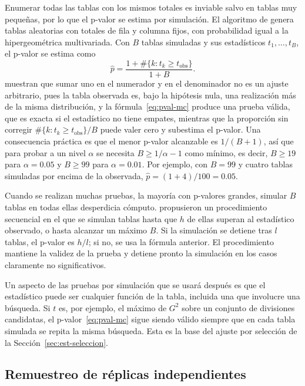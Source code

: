Enumerar todas las tablas con los mismos totales es inviable salvo en tablas muy
pequeñas, por lo que el p-valor se estima por simulación. El algoritmo de
\citet{Patefield1981} genera tablas aleatorias con totales de fila y columna
fijos, con probabilidad igual a la hipergeométrica multivariada. Con $B$ tablas
simuladas y sus estadísticos $t_1, \dots, t_B$, el p-valor se estima como
\begin{equation}\label{eq:pval-mc}
  \hat{p} = \frac{1 + \#\{k : t_k \ge t_{\mathrm{obs}}\}}{1 + B} .
\end{equation}
\citet{Phipson2010} muestran que sumar uno en el numerador y en el denominador no
es un ajuste arbitrario, pues la tabla observada es, bajo la hipótesis nula, una
realización más de la misma distribución, y la fórmula~\eqref{eq:pval-mc} produce
una prueba válida, que es exacta si el estadístico no tiene empates, mientras que la proporción sin corregir $\#\{k : t_k \ge
t_{\mathrm{obs}}\}/B$ puede valer cero y subestima el p-valor. Una consecuencia
práctica es que el menor p-valor alcanzable es $1/(B+1)$, así que para probar a un
nivel $\alpha$ se necesita $B \ge 1/\alpha - 1$ como mínimo, es decir, $B \ge 19$ para
$\alpha = 0.05$ y $B \ge 99$ para $\alpha = 0.01$. Por ejemplo, con $B = 99$ y
cuatro tablas simuladas por encima de la observada, $\hat{p} = (1+4)/100 = 0.05$.

Cuando se realizan muchas pruebas, la mayoría con p-valores grandes, simular $B$
tablas en todas ellas desperdicia cómputo. \citet{Besag1991} propusieron un
procedimiento secuencial en el que se simulan tablas hasta que $h$ de ellas superan al
estadístico observado, o hasta alcanzar un máximo $B$. Si la simulación se detiene
tras $l$ tablas, el p-valor es $h/l$; si no, se usa la fórmula anterior. El
procedimiento mantiene la validez de la prueba y detiene pronto la simulación en
los casos claramente no significativos.

Un aspecto de las pruebas por simulación que se usará después es que el
estadístico puede ser cualquier función de la tabla, incluida una que involucre
una búsqueda. Si $t$ es, por ejemplo, el máximo de $G^2$ sobre un conjunto de
divisiones candidatas, el p-valor~\eqref{eq:pval-mc} sigue siendo válido siempre
que en cada tabla simulada se repita la misma búsqueda. Esta es la base del ajuste
por selección de la Sección~\ref{sec:est-seleccion}.

\subsection{Remuestreo de réplicas independientes}\label{sec:est-bootstrap}

